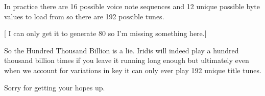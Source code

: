 In practice there are 16 possible voice note sequences and 12 unique possible byte values to load from 
so there are 192 possible tunes.

[ I can only get it to generate 80 so I'm missing something here.]

So the Hundred Thousand Billion is a lie. Iridis will indeed play a hundred thousand billion times if you 
leave it running long enough but ultimately even when we account for variations in key it can only ever play
192 unique title tunes.

Sorry for getting your hopes up.


